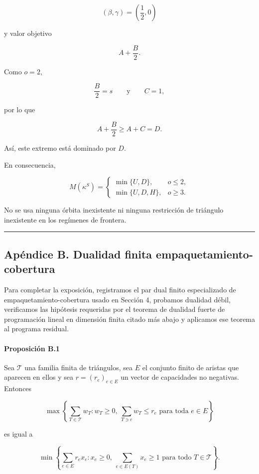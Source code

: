 \documentclass[
  spanish,
  11pt,
  a4paper,
]{article}
\begin{document}
\[
(\beta,\gamma)=\left(\frac12,0\right)
\]

y valor objetivo

\[
A+\frac B2.
\]

Como \(o=2\),

\[
\frac B2=s
\qquad\text{y}\qquad
C=1,
\]

por lo que

\[
A+\frac B2\ge A+C=D.
\]

Así, este extremo está dominado por \(D\).

En consecuencia,

\[
M(\kappa^S)
=
\begin{cases}
\min\{U,D\},&o\le2,\\[1mm]
\min\{U,D,H\},&o\ge3.
\end{cases}
\]

No se usa ninguna órbita inexistente ni ninguna restricción de triángulo inexistente en los regímenes de frontera.

\begin{center}\rule{0.5\linewidth}{0.5pt}\end{center}

\subsection{Apéndice B. Dualidad finita empaquetamiento-cobertura}\label{apuxe9ndice-b.-dualidad-finita-empaquetamiento-cobertura}

Para completar la exposición, registramos el par dual finito especializado de empaquetamiento-cobertura usado en Sección 4, probamos dualidad débil, verificamos las hipótesis requeridas por el teorema de dualidad fuerte de programación lineal en dimensión finita citado más abajo y aplicamos ese teorema al programa residual.

\paragraph{Proposición B.1}\label{proposiciuxf3n-b.1}

Sea \(\mathcal T\) una familia finita de triángulos, sea \(E\) el conjunto finito de aristas que aparecen en ellos y sea \(r=(r_e)_{e\in E}\) un vector de capacidades no negativas. Entonces

\[
\max\left\{
\sum_{T\in\mathcal T}w_T:
w_T\ge0,\ 
\sum_{T\ni e}w_T\le r_e
\text{ para toda }e\in E
\right\}
\]

es igual a

\[
\min\left\{
\sum_{e\in E}r_ex_e:
x_e\ge0,\ 
\sum_{e\in E(T)}x_e\ge1
\text{ para todo }T\in\mathcal T
\right\}.
\]
\end{document}
